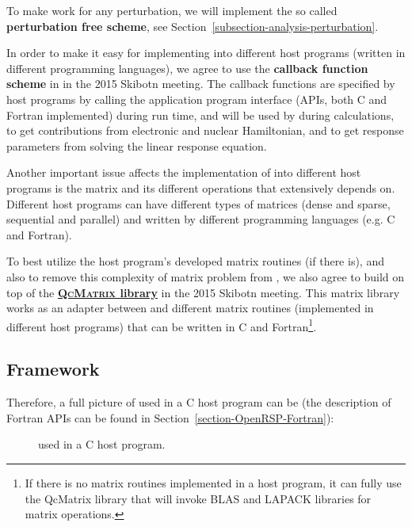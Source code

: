 To make \LibName work for any perturbation, we will implement the so called
\textbf{perturbation free scheme}, see Section~\ref{subsection-analysis-perturbation}.

In order to make it easy for implementing \LibName into different host programs
(written in different programming languages), we agree to use the
\textbf{callback function scheme} in \LibName
in the 2015 Skibotn meeting. The callback functions are specified by host
programs by calling the \LibName application program interface (APIs, both C
and Fortran implemented) during run time, and will be used by \LibName during
calculations, to get contributions from electronic and nuclear Hamiltonian, and
to get response parameters from solving the linear response equation.

Another important issue affects the implementation of \LibName into different
host programs is the matrix and its different operations that \LibName
extensively depends on. Different host programs can have different types of
matrices (dense and sparse, sequential and parallel) and written by different
programming languages (e.g. C and Fortran).

To best utilize the host program's developed matrix routines (if there is), and
also to remove this complexity of matrix problem from \LibName, we also agree
to build \LibName on top of the
\href{https://gitlab.com/bingao/qcmatrix}{\textbf{\textsc{QcMatrix} library}}
in the 2015 Skibotn meeting. This matrix library works as an adapter between
\LibName and different matrix routines (implemented in different host programs)
that can be written in C and Fortran\footnote{If there is no matrix routines
implemented in a host program, it can fully use the QcMatrix library that will
invoke BLAS and LAPACK libraries for matrix operations.}.

\subsection{\LibName Framework}

Therefore, a full picture of \LibName used in a C host program can be (the
description of \LibName Fortran APIs can be found in
Section~\ref{section-OpenRSP-Fortran}):

\begin{figure}[hbt]
  \centering
  \scalebox{0.7}{}
  \caption{\LibName used in a C host program.}
  \label{fig-openrsp-framework}
\end{figure}

